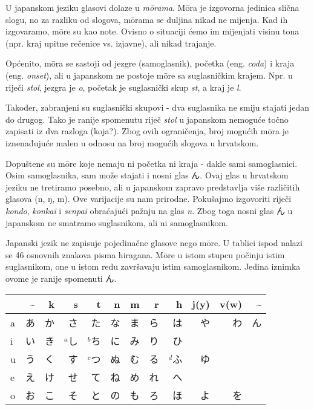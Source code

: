 
\author{autor}

	
	
	U japanskom jeziku glasovi dolaze u \textit{m\={o}rama}. M\={o}ra je izgovorna jedinica slična slogu, no za razliku od slogova, m\={o}rama se duljina nikad ne mijenja. Kad ih izgovaramo, m\={o}re su kao note. Ovisno o situaciji ćemo im mijenjati visinu tona (npr. kraj upitne rečenice vs. izjavne), ali nikad trajanje.
	
	Općenito, m\={o}ra se sastoji od jezgre (samoglasnik), početka (eng. \textit{coda}) i kraja (eng. \textit{onset}), ali u japanskom ne postoje m\={o}re sa suglasničkim krajem. Npr. u riječi \textit{stol}, jezgra je \textit{o}, početak je suglasnički skup \textit{st}, a kraj je \textit{l}.
	
	Također, zabranjeni su suglasnički skupovi - dva suglasnika ne smiju stajati jedan do drugog. Tako je ranije spomenutu riječ \textit{stol} u japanskom nemoguće točno zapisati iz dva razloga (koja?). Zbog ovih ograničenja, broj mogućih m\={o}ra je iznenađujuće malen u odnosu na broj mogućih slogova u hrvatskom.
	
	Dopuštene su m\={o}re koje nemaju ni početka ni kraja - dakle sami samoglasnici. Osim samoglasnika, sam može stajati i nosni glas ん. Ovaj glas u hrvatskom jeziku ne tretiramo posebno, ali u japanskom zapravo predstavlja više različitih glasova (n, ŋ, m). Ove varijacije su nam prirodne. Pokušajmo izgovoriti riječi \textit{kondo}, \textit{konkai} i \textit{senpai} obraćajući pažnju na glas \textit{n}. Zbog toga nosni glas ん u japanskom ne smatramo suglasnikom, ali ni samoglasnikom.
	
	
	Japanski jezik ne zapisuje pojedinačne glasove nego m\={o}re. U tablici ispod nalazi se 46 osnovnih znakova pisma hiragana. M\={o}re u istom stupcu počinju istim suglasnikom, one u istom redu završavaju istim samoglasnikom. Jedina iznimka ovome je ranije spomenuti ん.
	
	\setlength{\tabcolsep}{10pt}
	\vspace{10pt}
	\begin{tabular}{|l|r|r|r|r|r|r|r|r|r|r|r|}
		\hline
		&\textasciitilde&k&s&t&n&m&r&h&j(y)&v(w)&\textasciitilde\\
		\hline
		a&あ&か&さ&た&な&ま&ら&は&や&わ&ん\\
		i&い&き&$^a$し&$^b$ち&に&み&り&ひ&&&\\
		u&う&く&す&$^c$つ&ぬ&む&る&$^d$ふ&ゆ&&\\
		e&え&け&せ&て&ね&め&れ&へ&&&\\
		o&お&こ&そ&と&の&も&ろ&ほ&よ&を&\\
		\hline
	\end{tabular}
	
